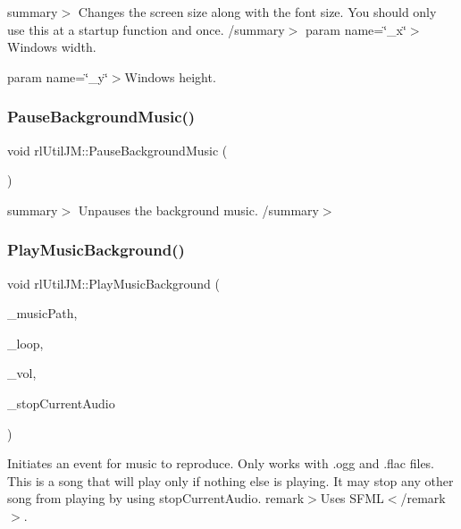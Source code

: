 summary$>$ Changes the screen size along with the font size. You should only use this at a startup function and once. /summary$>$ param name=\char`\"{}\+\_\+x\char`\"{}$>$Window\textquotesingle{}s width.

param name=\char`\"{}\+\_\+y\char`\"{}$>$Window\textquotesingle{}s height.\mbox{\label{classrl_util_j_m_a5c644b24e7f40914588ecc68843558e9}} 
\subsubsection{\texorpdfstring{Pause\+Background\+Music()}{PauseBackgroundMusic()}}
{\footnotesize\ttfamily void rl\+Util\+J\+M\+::\+Pause\+Background\+Music (\begin{DoxyParamCaption}{ }\end{DoxyParamCaption})\hspace{0.3cm}{\ttfamily [static]}}

summary$>$ Unpauses the background music. /summary$>$ \mbox{\label{classrl_util_j_m_ae639b58b2e2e5005713ddcc2fb8aae85}} 
\subsubsection{\texorpdfstring{Play\+Music\+Background()}{PlayMusicBackground()}}
{\footnotesize\ttfamily void rl\+Util\+J\+M\+::\+Play\+Music\+Background (\begin{DoxyParamCaption}\item[{const char $\ast$}]{\+\_\+music\+Path,  }\item[{const B\+O\+OL \&}]{\+\_\+loop,  }\item[{const float \&}]{\+\_\+vol,  }\item[{const B\+O\+OL \&}]{\+\_\+stop\+Current\+Audio }\end{DoxyParamCaption})\hspace{0.3cm}{\ttfamily [static]}}



Initiates an event for music to reproduce. Only works with .ogg and .flac files. This is a song that will play only if nothing else is playing. It may stop any other song from playing by using stop\+Current\+Audio. remark$>$Uses S\+F\+ML$<$/remark$>$.

